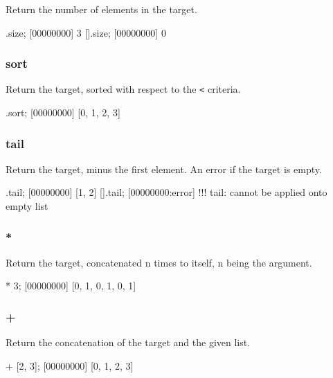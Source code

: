 Return the number of elements in the target.

\begin{urbiscript}
[1, 2, 3].size;
[00000000] 3
[].size;
[00000000] 0
\end{urbiscript}

\subsubsection{sort}

Return the target, sorted with respect to the \lstinline|<| criteria.

\begin{urbiscript}
[1, 0, 3, 2].sort;
[00000000] [0, 1, 2, 3]
\end{urbiscript}

\subsubsection{tail}

Return the target, minus the first element. An error if the target is
empty.

\begin{urbiscript}
[0, 1, 2].tail;
[00000000] [1, 2]
[].tail;
[00000000:error] !!! tail: cannot be applied onto empty list
\end{urbiscript}

\subsubsection{*}

Return the target, concatenated n times to itself, n being the
argument.

\begin{urbiscript}
[0, 1] * 3;
[00000000] [0, 1, 0, 1, 0, 1]
\end{urbiscript}

\subsubsection{+}

Return the concatenation of the target and the given list.

\begin{urbiscript}
[0, 1] + [2, 3];
[00000000] [0, 1, 2, 3]
\end{urbiscript}

